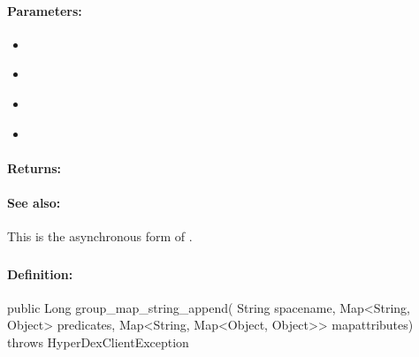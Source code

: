 \paragraph{Parameters:}
\begin{itemize}[noitemsep]
\item {}\\

\item {}\\

\item {}\\

\item {}\\

\end{itemize}

\paragraph{Returns:}


\paragraph{See also:}  This is the asynchronous form of .

\pagebreak
\subsubsection{}
\label{api:java:group_map_string_append}


\paragraph{Definition:}
\begin{javacode}
public Long group_map_string_append(
        String spacename,
        Map<String, Object> predicates,
        Map<String, Map<Object, Object>> mapattributes) throws HyperDexClientException
\end{javacode}

